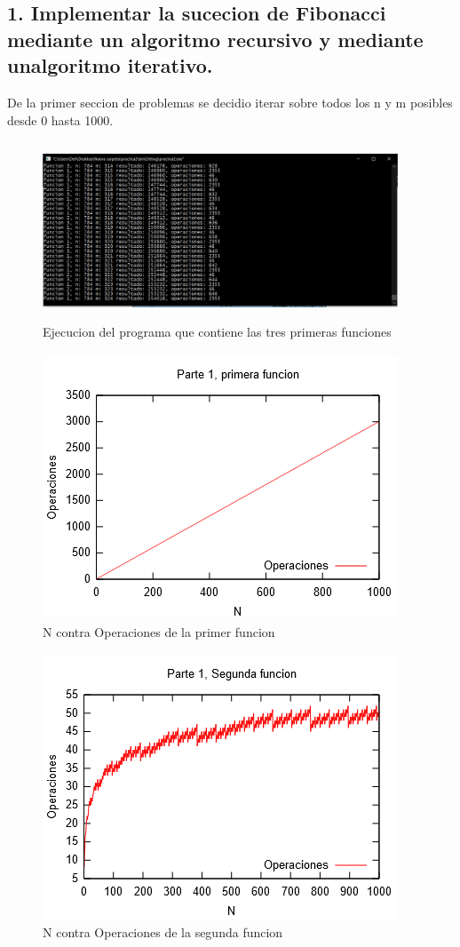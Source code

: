 \documentclass[spanish]{article}
\begin{document}
		\subsection{1.  Implementar la sucecion de Fibonacci mediante un algoritmo recursivo y mediante unalgoritmo iterativo.}
			De la primer seccion de problemas se decidio iterar sobre todos los n y m posibles desde 0 hasta 1000.\\
			\begin{figure}[h!]
				\centering
				\includegraphics[width=400px,height=200px]{ejecucionPrimeraParte}
				\caption{Ejecucion del programa que contiene las tres primeras funciones}
			\end{figure}
			\begin{figure}[h!]
				\centering
				\includegraphics[width=400px,height=300px]{grafica1}
				\caption{N contra Operaciones de la primer funcion}
			\end{figure}
			\begin{figure}[H]
				\centering
				\includegraphics[width=400px,height=300px]{grafica2}
				\caption{N contra Operaciones de la segunda funcion}
			\end{figure}
\end{document}
